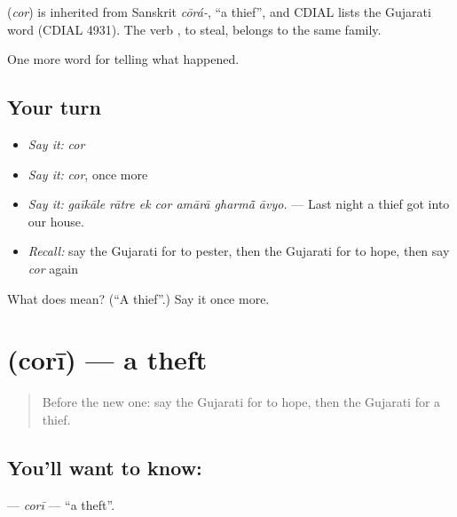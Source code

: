 \begin{cousinweb}
\textbf{} (\emph{cor}) is inherited from Sanskrit \emph{cōrá-}, \textquotedblleft{}a thief\textquotedblright{}, and CDIAL lists the Gujarati word (CDIAL 4931). The verb \textbf{}, to steal, belongs to the same family.
\end{cousinweb}

\begin{grammarlens}[title={What you've built}]
One more word for telling what happened.
\end{grammarlens}

\subsection*{Your turn}
\begin{itemize}
\raggedright
  \item \emph{Say it:} \emph{cor}
  \item \emph{Say it:} \emph{cor}, once more
  \item \emph{Say it:} \emph{gaīkāle rātre ek cor amārā gharmā̃ āvyo.} — Last night a thief got into our house.
  \item \emph{Recall:} say the Gujarati for to pester, then the Gujarati for to hope, then say \emph{cor} again
\end{itemize}

\begin{tcolorbox}[breakable,colback=teal!4,colframe=teal!35!black,title={Before you move on}]
What does  mean? (\textquotedblleft{}A thief\textquotedblright{}.) Say it once more.
\end{tcolorbox}
\section[\texorpdfstring{\gu{ચોરી} (corī)}{ચોરી (corī)}]{ (corī) — a theft}

\label{lesson:GU-C285-cori}



\begin{quote}
Before the new one: say the Gujarati for to hope, then the Gujarati for a thief.
\end{quote}

\subsection*{You'll want to know: }
\textbf{} — \emph{corī} — \textquotedblleft{}a theft\textquotedblright{}.

